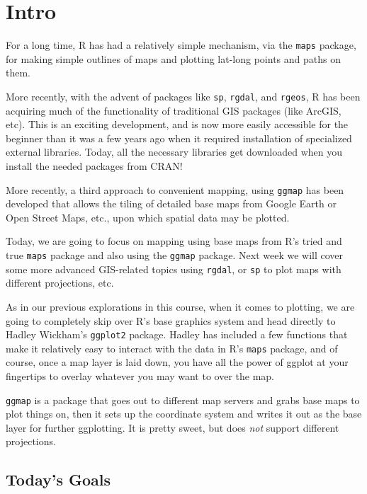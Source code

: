 \documentclass[]{book}
\theoremstyle{definition}
\theoremstyle{definition}
\theoremstyle{remark}
\begin{document}
\section{Intro}\label{map-making-intro}

For a long time, R has had a relatively simple mechanism, via the
\texttt{maps} package, for making simple outlines of maps and plotting
lat-long points and paths on them.

More recently, with the advent of packages like \texttt{sp},
\texttt{rgdal}, and \texttt{rgeos}, R has been acquiring much of the
functionality of traditional GIS packages (like ArcGIS, etc). This is an
exciting development, and is now more easily accessible for the beginner
than it was a few years ago when it required installation of specialized
external libraries. Today, all the necessary libraries get downloaded
when you install the needed packages from CRAN!

More recently, a third approach to convenient mapping, using
\texttt{ggmap} has been developed that allows the tiling of detailed
base maps from Google Earth or Open Street Maps, etc., upon which
spatial data may be plotted.

Today, we are going to focus on mapping using base maps from R's tried
and true \texttt{maps} package and also using the \texttt{ggmap}
package. Next week we will cover some more advanced GIS-related topics
using \texttt{rgdal}, or \texttt{sp} to plot maps with different
projections, etc.

As in our previous explorations in this course, when it comes to
plotting, we are going to completely skip over R's base graphics system
and head directly to Hadley Wickham's \texttt{ggplot2} package. Hadley
has included a few functions that make it relatively easy to interact
with the data in R's \texttt{maps} package, and of course, once a map
layer is laid down, you have all the power of ggplot at your fingertips
to overlay whatever you may want to over the map.

\texttt{ggmap} is a package that goes out to different map servers and
grabs base maps to plot things on, then it sets up the coordinate system
and writes it out as the base layer for further ggplotting. It is pretty
sweet, but does \emph{not} support different projections.

\subsection{Today's Goals}\label{todays-goals}
\end{document}
